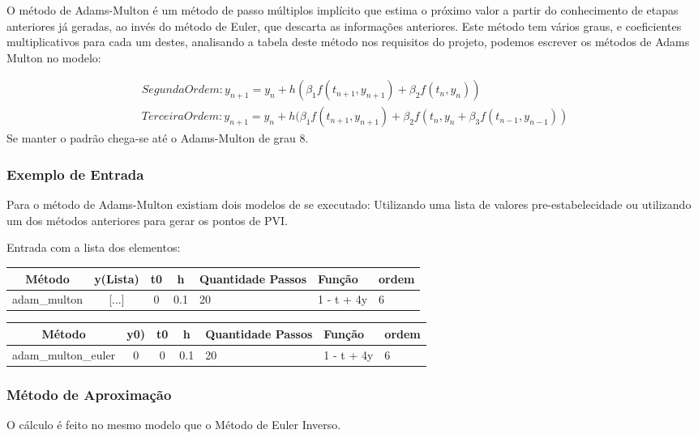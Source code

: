 \documentclass[a4paper]{article}
\begin{document}
O método de Adams-Multon é um método de passo múltiplos implícito que estima o próximo valor a partir do conhecimento de etapas anteriores já geradas, ao invés do método de Euler, que descarta as informações anteriores. Este método  tem vários graus, e coeficientes multiplicativos para cada um destes, analisando a tabela deste método nos requisitos do projeto, podemos escrever os métodos de Adams Multon no modelo:

\begin{equation}\label{eq:eq_a_m}
\begin{aligned}
Segunda Ordem: y_{n+1} = y_n + h(\beta_1f(t_{n + 1},y_{n + 1}) + \beta_2f(t_{n},y_{n})) \\
Terceira Ordem: y_{n+1} = y_n + h(\beta_1f(t_{n + 1},y_{n + 1}) + \beta_2f(t_{n},y_{n} + \beta_3f(t_{n-1},y_{n-1}))
\end{aligned}
\end{equation}
Se manter o padrão chega-se até o Adams-Multon de grau 8.

\subsubsection{Exemplo de Entrada}
Para o método de Adams-Multon existiam dois modelos de se executado: Utilizando uma lista de valores pre-estabelecidade ou utilizando um dos métodos anteriores para gerar os pontos de PVI. \par
Entrada com a lista dos elementos:
\begin{table}[H]
\centering
\begin{tabular}{|c|c|c|c|l|l|l|}
\hline
Método & y(Lista) & t0 & h   & Quantidade Passos & Função & ordem\\ \hline
adam\_multon  & [...]  & 0  & 0.1 & 20                &  1 - t + 4y & 6     \\ \hline
\end{tabular}
\end{table}

\begin{table}[H]
\centering
\begin{tabular}{|c|c|c|c|l|l|l|}
\hline
Método & y0) & t0 & h   & Quantidade Passos & Função & ordem\\ \hline
adam\_multon\_euler  & 0  & 0  & 0.1 & 20                &  1 - t + 4y & 6     \\ \hline
\end{tabular}
\end{table}


\subsubsection{Método de Aproximação}
O cálculo é feito no mesmo modelo que o Método de Euler Inverso.
\end{document}
